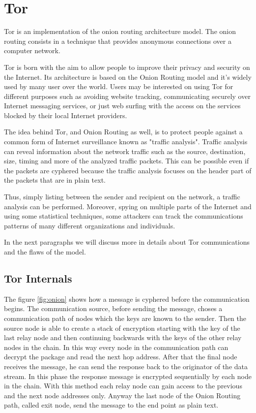 \section{Tor}
\label{sec:tor}

Tor is an implementation of the onion routing architecture model. The
onion routing consists in a technique that provides anonymous
connections over a computer network\cite{goldschlag1999onion}.

Tor is born with the aim to allow people to
improve their privacy and security on the Internet. Its architecture is
based on the Onion Routing model and it's widely used by many user over
the world. Users may be interested on using Tor for different purposes
such as avoiding website tracking, communicating securely over Internet
messaging services, or just web surfing with the access on the services
blocked by their local Internet providers.

The idea behind Tor, and Onion Routing as well, is to protect people
against a common form of Internet surveillance known as "traffic
analysis". Traffic analysis can reveal information about the network
traffic such as the source, destination, size, timing and more of the
analyzed traffic packets. This can be possible even if the packets are
cyphered because the traffic analysis focuses on the header part of the
packets that are in plain text. 

Thus, simply listing between the sender and recipient on the network,
a traffic analysis can be performed. Moreover, spying on multiple parts
of the Internet and using some statistical techniques, some attackers can
track the communications patterns of many different organizations and
individuals.

In the next paragraphs we will discuss more in details about Tor communications 
and the flaws of the model.

\subsection{Tor Internals}
The figure \ref{fig:onion} shows how a
message is cyphered before the communication begins. The communication
source, before sending the message, choses a communication path of nodes
which the keys are known to the sender.
Then the source node is able to create a stack of encryption starting
with the key of the last relay node and then continuing backwards with
the keys of the other relay nodes in the chain. In this way every node
in the communication path can decrypt the package and read the next hop
address. After that the final node receives the message, he can send the
response back to the originator of the data stream. In this phase the response
message is encrypted sequentially by each node in the chain. 
With this method each relay node can gain access to the
previous and the next node addresses only. Anyway the last node of the
Onion Routing path, called exit node, send the message to the end point
as plain text.

